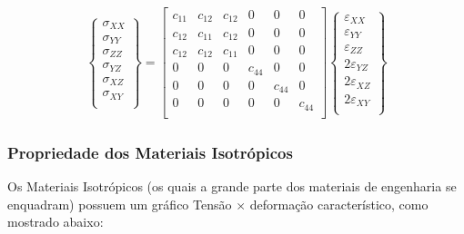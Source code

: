 \documentclass{article}
\begin{document}
\begin{align*}
    \begin{Bmatrix}
        \sigma_{XX} \\
        \sigma_{YY} \\
        \sigma_{ZZ} \\
        \sigma_{YZ} \\
        \sigma_{XZ} \\
        \sigma_{XY} \\
    \end{Bmatrix} =
    \begin{bmatrix}
        c_{11} & c_{12} & c_{12} & 0      & 0      & 0      \\
        c_{12} & c_{11} & c_{12} & 0      & 0      & 0      \\
        c_{12} & c_{12} & c_{11} & 0      & 0      & 0      \\
        0      & 0      & 0      & c_{44} & 0      & 0      \\
        0      & 0      & 0      & 0      & c_{44} & 0      \\
        0      & 0      & 0      & 0      & 0      & c_{44} \\
    \end{bmatrix}
    \begin{Bmatrix}
        \varepsilon_{XX}  \\
        \varepsilon_{YY}  \\
        \varepsilon_{ZZ}  \\
        2\varepsilon_{YZ} \\
        2\varepsilon_{XZ} \\
        2\varepsilon_{XY} \\
    \end{Bmatrix}
\end{align*}

\newpage
\subsubsection{Propriedade dos Materiais Isotrópicos}
Os Materiais Isotrópicos (os quais a grande parte dos materiais de engenharia se enquadram) possuem um gráfico Tensão $\times$ deformação característico, como mostrado abaixo:
\end{document}
